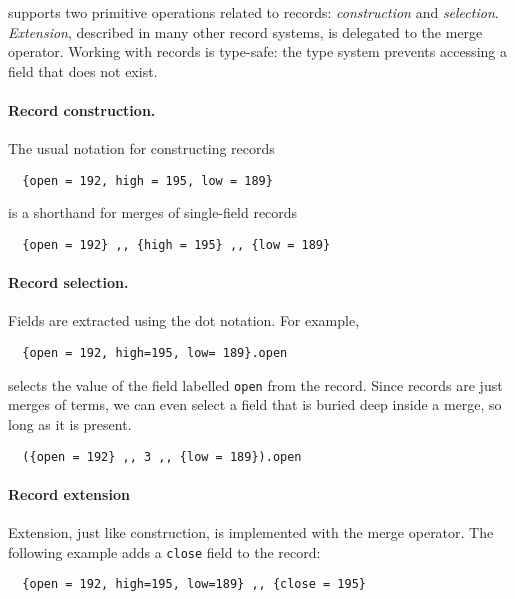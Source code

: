 \name supports two primitive operations related to records:
\textit{construction} and \textit{selection}. \textit{Extension}, described in
many other record systems, is delegated to the merge operator. Working with
records is type-safe: the type system prevents accessing a field that does not
exist.

\paragraph{Record construction.} The usual notation for constructing records
\begin{lstlisting}
  {open = 192, high = 195, low = 189}
\end{lstlisting}
is a shorthand for merges of single-field records
\begin{lstlisting}
  {open = 192} ,, {high = 195} ,, {low = 189}
\end{lstlisting}

\paragraph{Record selection.} Fields are extracted using the dot notation. For
example,
\begin{lstlisting}
  {open = 192, high=195, low= 189}.open
\end{lstlisting}
selects the value of the field labelled \lstinline{open} from the record. Since
records are just merges of terms, we can even select a field that is buried deep
inside a merge, so long as it is present.
\begin{lstlisting}
  ({open = 192} ,, 3 ,, {low = 189}).open
\end{lstlisting}

\paragraph{Record extension} Extension, just like construction, is implemented
with the merge operator. The following example adds a \lstinline{close} field to
the record:
\begin{lstlisting}
  {open = 192, high=195, low=189} ,, {close = 195}
\end{lstlisting}


